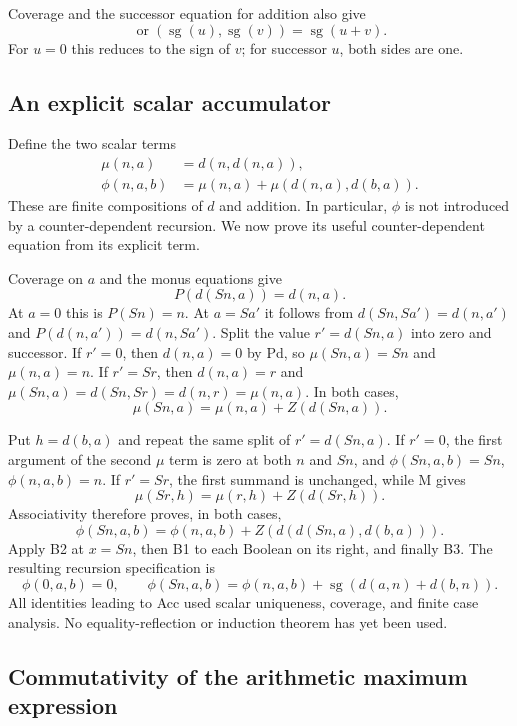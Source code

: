 Coverage and the successor equation for addition also give
\[
 \operatorname{or}(\operatorname{sg}(u),\operatorname{sg}(v))
       =\operatorname{sg}(u+v).
 \tag{B3}\label{eq:ur-sign-or}
\]
For $u=0$ this reduces to the sign of $v$; for successor $u$, both
sides are one.

\subsection{An explicit scalar accumulator}

Define the two scalar terms
\begin{equation}
\begin{aligned}
 \mu(n,a)&=d(n,d(n,a)),\\
 \phi(n,a,b)&=\mu(n,a)+\mu(d(n,a),d(b,a)).
\end{aligned}
 \label{eq:ur-scalar-accumulator}
\end{equation}
These are finite compositions of $d$ and addition. In particular,
$\phi$ is not introduced by a counter-dependent recursion.
We now prove its useful counter-dependent equation from its explicit term.

Coverage on $a$ and the monus equations give
\[
                         P(d(Sn,a))=d(n,a).
 \tag{Pd}
\]
At $a=0$ this is $P(Sn)=n$. At $a=Sa'$ it follows from
$d(Sn,Sa')=d(n,a')$ and $P(d(n,a'))=d(n,Sa')$.
Split the value $r'=d(Sn,a)$ into zero and successor.
If $r'=0$, then $d(n,a)=0$ by Pd, so
$\mu(Sn,a)=Sn$ and $\mu(n,a)=n$.
If $r'=Sr$, then $d(n,a)=r$ and
$\mu(Sn,a)=d(Sn,Sr)=d(n,r)=\mu(n,a)$.
In both cases,
\[
             \mu(Sn,a)=\mu(n,a)+Z(d(Sn,a)).              \tag{M}
\]

Put $h=d(b,a)$ and repeat the same split of $r'=d(Sn,a)$.
If $r'=0$, the first argument of the second $\mu$ term is zero at both
$n$ and $Sn$, and $\phi(Sn,a,b)=Sn$, $\phi(n,a,b)=n$.
If $r'=Sr$, the first summand is unchanged, while M gives
\[
                 \mu(Sr,h)=\mu(r,h)+Z(d(Sr,h)).
\]
Associativity therefore proves, in both cases,
\[
 \phi(Sn,a,b)=\phi(n,a,b)+Z(d(d(Sn,a),d(b,a))).
\]
Apply B2 at $x=Sn$, then B1 to each Boolean on its right, and finally B3.
The resulting recursion specification is
\[
 \boxed{\quad
 \phi(0,a,b)=0,\qquad
 \phi(Sn,a,b)=\phi(n,a,b)+\operatorname{sg}(d(a,n)+d(b,n)).
 \quad}                                                   \tag{Acc}
\]
All identities leading to Acc used scalar uniqueness, coverage, and
finite case analysis. No equality-reflection or induction theorem has
yet been used.

\subsection{Commutativity of the arithmetic maximum expression}

